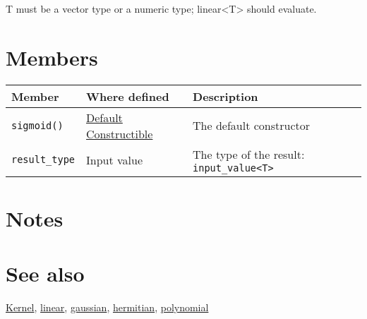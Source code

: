 \documentclass{article}
\begin{document}
T must be a vector type or a numeric type; linear<T> should evaluate.


\section*{Members}

\begin{tabular}{lll}
\textbf{Member} & \textbf{Where defined} & \textbf{Description} \\ 
\hline
\texttt{sigmoid()} & \href{http://www.sgi.com/tech/stl/DefaultConstructible.html}{Default Constructible} & The default constructor \\
\texttt{result_type} & Input value & The type of the result: \texttt{input_value<T>} \\
\end{tabular}

\section*{Notes}

\section*{See also}

\href{\kmlroot/reference/kernel.html}{Kernel},
\href{\kmlroot/reference/linear.html}{linear},
\href{\kmlroot/reference/gaussian.html}{gaussian},
\href{\kmlroot/reference/hermitian.html}{hermitian},
\href{\kmlroot/reference/polynomial.html}{polynomial}



\end{document}
